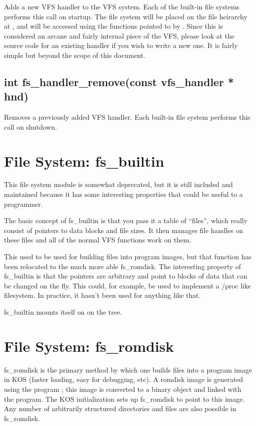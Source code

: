 \documentclass[english]{report}
\begin{document}
Adds a new VFS handler to the VFS system. Each of the built-in file
systems performs this call on startup. The file system will be placed
on the file heirarchy at , and will be accessed using
the functions pointed to by . Since this is considered an
arcane and fairly internal piece of the VFS, please look at the source
code for an existing handler if you wish to write a new one. It is
fairly simple but beyond the scope of this document.


\subsection{int fs\_handler\_remove(const vfs\_handler * hnd)}

Removes a previously added VFS handler. Each built-in file system
performs this call on shutdown.


\section{File System: fs\_builtin}

This file system module is somewhat deprecated, but it is still included
and maintained because it has some interesting properties that could
be useful to a programmer.

The basic concept of fs\_builtin is that you pass it a table of ``files'',
which really consist of pointers to data blocks and file sizes. It
then manages file handles on these files and all of the normal VFS
functions work on them.

This used to be used for building files into program images, but that
function has been relocated to the much more able fs\_romdisk. The
interesting property of fs\_builtin is that the pointers are arbitrary
and point to blocks of data that can be changed on the fly. This could,
for example, be used to implement a /proc like filesystem. In practice,
it hasn't been used for anything like that.

fs\_builtin mounts itself on  on the tree.


\section{File System: fs\_romdisk}

fs\_romdisk is the primary method by which one builds files into a
program image in KOS (faster loading, easy for debugging, etc). A
romdisk image is generated using the program ; this
image is converted to a binary object and linked with the program.
The KOS initialization sets up fs\_romdisk to point to this image.
Any number of arbitrarily structured directories and files are also
possible in fs\_romdisk.
\end{document}
